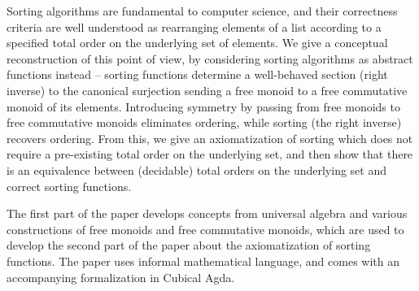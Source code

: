 
Sorting algorithms are fundamental to computer science, and their correctness
criteria are well understood as rearranging elements of a list
according to a specified total order on the underlying set of elements.
We give a conceptual reconstruction of this point of view, by considering
sorting algorithms as abstract functions instead -- sorting functions determine a
well-behaved section (right inverse) to the canonical surjection sending a free
monoid to a free commutative monoid of its elements.
Introducing symmetry by passing from free monoids to free commutative monoids
eliminates ordering, while sorting (the right inverse) recovers ordering.
From this, we give an axiomatization of sorting which does not require a
pre-existing total order on the underlying set, and then show that there is an
equivalence between (decidable) total orders on the underlying set and correct
sorting functions.

The first part of the paper develops concepts from universal algebra and various
constructions of free monoids and free commutative monoids, which are used to
develop the second part of the paper about the axiomatization of sorting
functions.
The paper uses informal mathematical language, and comes with an accompanying
formalization in Cubical Agda.
